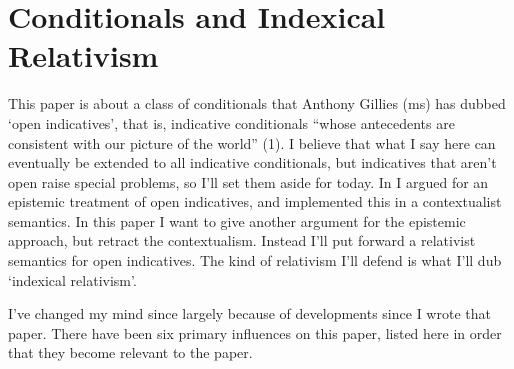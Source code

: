 

%
%
%
%
%
%
%
%
%
%
{
\chapter{Conditionals and Indexical Relativism}

\par}

\noindent This paper is about a class of conditionals that Anthony Gillies (ms) has dubbed `open indicatives', that is, indicative conditionals ``whose antecedents are consistent with our picture of the world'' (1). I believe that what I say here can eventually be extended to all indicative conditionals, but indicatives that aren't open raise special problems, so I'll set them aside for today. In \citet{Weatherson2001-WEAIAS} I argued for an epistemic treatment of open indicatives, and implemented this in a contextualist semantics. In this paper I want to give another argument for the epistemic approach, but retract the contextualism. Instead I'll put forward a relativist semantics for open indicatives. The kind of relativism I'll defend is what I'll dub `indexical relativism'.

I've changed my mind since \citet{Weatherson2001-WEAIAS} largely because of developments since I wrote that paper. There have been six primary influences on this paper, listed here in order that they become relevant to the paper.

